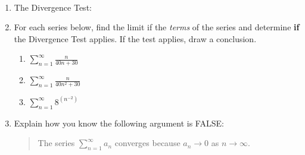 \documentclass[11pt,fleqn]{article}
\begin{document}
\renewcommand{\headrulewidth}{0pt}
\newcommand{\blank}[1]{\rule{#1}{0.75pt}}
\newcommand{\bc}{\begin{center}}
\newcommand{\ec}{\end{center}}


\vspace*{-0.7in}

\begin{center}
  \large
  \\
   
\end{center}
\begin{enumerate}
\item The Divergence Test:
\vfill
\item For each series below, find the limit if the \emph{terms} of the series and determine \textbf{if} the Divergence Test applies. If the test applies, draw a conclusion. 
	\begin{enumerate}
	\item $\displaystyle{\sum_{n=1}^\infty \frac{n}{40n+30}}$
	\vfill
	\item $\displaystyle{\sum_{n=1}^\infty \frac{n}{40n^2+30}}$
	\vfill
	\item $\displaystyle{\sum_{n=1}^\infty 8^{(n^{-2})} }$
	\vfill
	\end{enumerate}
\item Explain how you know the following argument is FALSE:\\
\begin{quote}
The series $\displaystyle{\sum_{n=1}^\infty a_n}$ converges because $a_n \to 0$ as $n \to \infty.$
\end{quote}
\vspace{.5in}
\end{enumerate}
\end{document}
